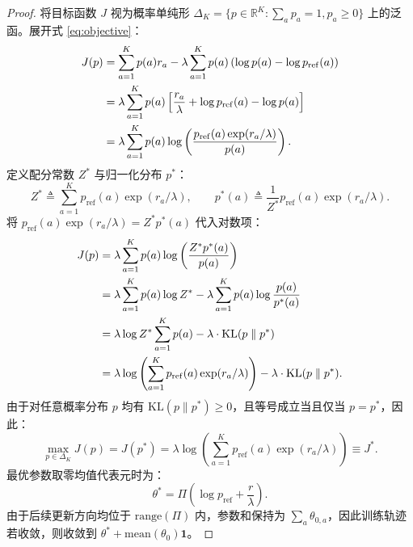 \documentclass[11pt, a4paper, UTF8]{ctexart}
\begin{document}
\begin{proof}
将目标函数 $J$ 视为概率单纯形 $\Delta_K = \{p \in \mathbb{R}^K : \sum_a p_a = 1, p_a \ge 0\}$ 上的泛函。展开式 \eqref{eq:objective}：
\begin{align}
    J(p) &= \sum_{a=1}^K p(a) r_a - \lambda \sum_{a=1}^K p(a) \left( \log p(a) - \log p_{\mathrm{ref}}(a) \right) \notag \\
    &= \lambda \sum_{a=1}^K p(a) \left[ \frac{r_a}{\lambda} + \log p_{\mathrm{ref}}(a) - \log p(a) \right] \notag \\
    &= \lambda \sum_{a=1}^K p(a) \log \left( \frac{p_{\mathrm{ref}}(a) \exp(r_a / \lambda)}{p(a)} \right).
\end{align}
定义配分常数 $Z^*$ 与归一化分布 $p^*$：
\begin{equation}
    Z^* \triangleq \sum_{a=1}^K p_{\mathrm{ref}}(a) \exp(r_a / \lambda), \qquad p^*(a) \triangleq \frac{1}{Z^*} p_{\mathrm{ref}}(a) \exp(r_a / \lambda).
\end{equation}
将 $p_{\mathrm{ref}}(a) \exp(r_a / \lambda) = Z^* p^*(a)$ 代入对数项：
\begin{align}
    J(p) &= \lambda \sum_{a=1}^K p(a) \log \left( \frac{Z^* p^*(a)}{p(a)} \right) \notag \\
    &= \lambda \sum_{a=1}^K p(a) \log Z^* - \lambda \sum_{a=1}^K p(a) \log \frac{p(a)}{p^*(a)} \notag \\
    &= \lambda \log Z^* \sum_{a=1}^K p(a) - \lambda \cdot \mathrm{KL}(p \parallel p^*) \notag \\
    &= \lambda \log \left( \sum_{a=1}^K p_{\mathrm{ref}}(a) \exp(r_a / \lambda) \right) - \lambda \cdot \mathrm{KL}(p \parallel p^*).
\end{align}
由于对任意概率分布 $p$ 均有 $\mathrm{KL}(p \parallel p^*) \ge 0$，且等号成立当且仅当 $p = p^*$，因此：
\begin{equation}
    \max_{p \in \Delta_K} J(p) = J(p^*) = \lambda \log \left( \sum_{a=1}^K p_{\mathrm{ref}}(a) \exp(r_a / \lambda) \right) \equiv J^*.
\end{equation}
最优参数取零均值代表元时为：
\begin{equation}
    \theta^* = \Pi \left( \log p_{\mathrm{ref}} + \frac{r}{\lambda} \right).
\end{equation}
由于后续更新方向均位于 $\mathrm{range}(\Pi)$ 内，参数和保持为 $\sum_a \theta_{0, a}$，因此训练轨迹若收敛，则收敛到 $\theta^* + \mathrm{mean}(\theta_0)\mathbf{1}$。
\end{proof}

\end{document}
